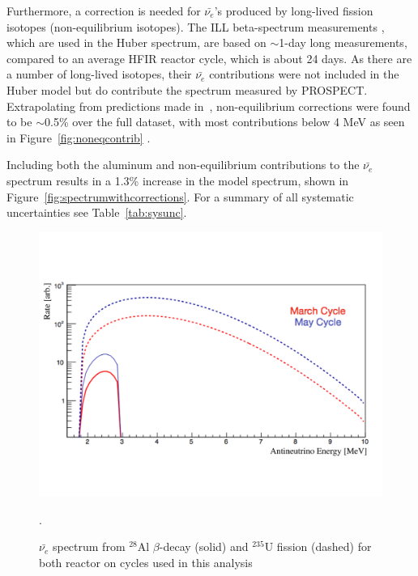 Furthermore, a correction is needed for $\bar{\nu_{e}}$'s produced by long-lived fission isotopes (non-equilibrium isotopes).
The ILL beta-spectrum measurements \cite{VonFeilitzsch:1982jw, Schreckenbach:1985ep, Hahn:1989zr}, which are used in the Huber spectrum, are based on $\sim$1-day long measurements, compared to an average HFIR reactor cycle, which is about 24 days.
As there are a number of long-lived isotopes, their $\bar{\nu_{e}}$ contributions were not included in the Huber model but do contribute the spectrum measured by PROSPECT.
Extrapolating from predictions made in~\cite{Mueller}, non-equilibrium corrections were found to be $\sim$0.5\% over the full dataset, with most contributions below 4 MeV as seen in Figure~\ref{fig:noneqcontrib} \cite{PSurukuchi:2346}.

Including both the aluminum and non-equilibrium contributions to the $\bar{\nu_{e}}$ spectrum results in a 1.3\% increase in the model spectrum, shown in Figure~\ref{fig:spectrumwithcorrections}.
For a summary of all systematic uncertainties see Table~\ref{tab:sysunc}.

\begin{figure}[H]
	\centering
	\includegraphics[width=0.7\linewidth]{tex/7-oscillation-images/AlContrib}
	\caption[]{$\bar{\nu_{e}}$ spectrum from $^{28}$Al $\beta$-decay (solid) and $^{235}$U fission (dashed) for both reactor on cycles used in this analysis \cite{PSurukuchi:2338}}.
	\label{fig:alcontrib}
\end{figure}

